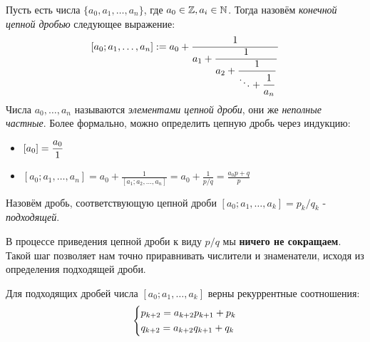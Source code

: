 \begin{definition}
	Пусть есть числа $\{a_0, a_1, \ldots, a_n\}$, где $a_0 \in \mathbb{Z}, a_i \in \mathbb{N}$. Тогда назовём \textit{конечной цепной дробью} следующее выражение:
	\[
		[a_0; a_1, \ldots, a_n] := a_0 + \frac{1}{\displaystyle a_1 + \frac{1}{\displaystyle a_2 + \frac{1}{\displaystyle \ddots + \frac{1}{a_n}}}}
	\]
	Числа $a_0, \ldots, a_n$ называются \textit{элементами цепной дроби}, они же \textit{неполные частные}.
	Более формально, можно определить цепную дробь через индукцию:
	\begin{itemize}
		\item \(\displaystyle [a_0] = \frac{a_0}{1}\)
		\item \([a_0; a_1, \ldots, a_n] = a_0 + \displaystyle\frac{1}{[a_1; a_2, \ldots, a_n]} = a_0 + \frac{1}{p/q} = \frac{a_0p + q}{p}\)
	\end{itemize}
\end{definition}

\begin{definition}
	Назовём дробь, соответствующую цепной дроби $[a_0; a_1, \ldots, a_k] = p_k/q_k$ - \textit{подходящей}.
\end{definition}

\begin{note}
	В процессе приведения цепной дроби к виду $p/q$ мы \textbf{ничего не сокращаем}. Такой шаг позволяет нам точно приравнивать числители и знаменатели, исходя из определения подходящей дроби.
\end{note}

\begin{theorem}
	Для подходящих дробей числа $[a_0; a_1, \ldots, a_k]$ верны рекуррентные соотношения:
	\[
		\left\{\begin{aligned}
			&{p_{k + 2} = a_{k + 2}p_{k + 1} + p_k}
			\\
			&{q_{k + 2} = a_{k + 2}q_{k + 1} + q_k}
		\end{aligned}\right.
	\]
\end{theorem}

